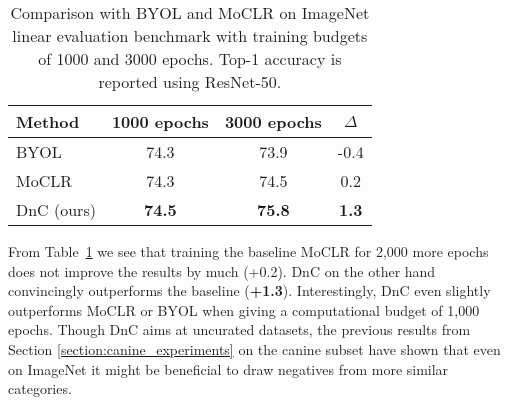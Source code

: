 \documentclass[final]{cvpr}
\newcommand\showdiff[1]{\textbf{\textcolor{nicergreen}{#1}}}
\newcommand\baseline{MoCLR}
\begin{document}
\begin{table}[h]
\caption{Comparison with BYOL and MoCLR on ImageNet linear evaluation benchmark with training budgets of 1000 and 3000 epochs. Top-1 accuracy is reported using ResNet-50.
}
\vspace{-4pt}
\label{tab:imagenet_results}
\begin{center}
\begin{small}
\begin{tabular}{lccc}
\toprule

Method & 1000 epochs & 3000 epochs & $\Delta$ \\
\midrule
BYOL        & 74.3 & 73.9 & -0.4 \\
MoCLR       & 74.3 & 74.5 & 0.2  \\
DnC (ours)  & \cellcolor{DnCBG}\textbf{74.5} & \cellcolor{DnCBG}\textbf{75.8} & \cellcolor{DnCBG}\textbf{1.3}  \\
\bottomrule

\end{tabular}
\end{small}
\end{center}
\vspace{-15pt}
\end{table} 
From Table~\ref{tab:imagenet_results} we see that training the baseline \baseline{} for 2,000 more epochs does not improve the results by much (+0.2). DnC on the other hand convincingly outperforms the baseline (\showdiff{+1.3}). Interestingly, DnC even slightly outperforms \baseline{} or BYOL when giving a computational budget of 1,000 epochs. Though DnC aims at uncurated datasets, the previous results from Section \ref{section:canine_experiments} on the canine subset have shown that even on ImageNet it might be beneficial to draw negatives from more similar categories.
\end{document}
